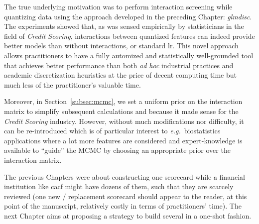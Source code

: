 The true underlying motivation was to perform interaction screening while quantizing data using the approach developed in the preceding Chapter: \textit{glmdisc}.
The experiments showed that, as was sensed empirically by statisticians in the field of \textit{Credit Scoring}, interactions between quantized features can indeed provide better models than without interactions, or standard \gls{lr}. This novel approach allows practitioners to have a fully automized and statistically well-grounded tool that achieves better performance than both \textit{ad hoc} industrial practices and academic discretization heuristics at the price of decent computing time but much less of the practitioner's valuable time.

Moreover, in Section~\ref{subsec:mcmc}, we set a uniform prior on the interaction matrix to simplify subsequent calculations and because it made sense for the \textit{Credit Scoring} industry. However, without much modifications nor difficulty, it can be re-introduced which is of particular interest to \textit{e.g.}\ biostatistics applications where a lot more features are considered and expert-knowledge is available to ``guide'' the MCMC by choosing an appropriate prior over the interaction matrix.

\bigskip

The previous Chapters were about constructing one scorecard while a financial institution like \gls{cacf} might have dozens of them, such that they are scarcely reviewed (one new / replacement scorecard should appear to the reader, at this point of the manuscript, relatively costly in terms of practitioners' time). The next Chapter aims at proposing a strategy to build several in a one-shot fashion.



\printbibliography[heading=subbibliography, title=References of Chapter 4]
